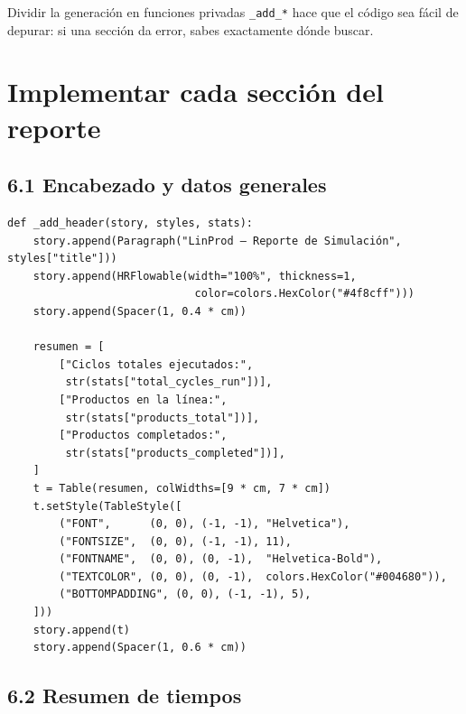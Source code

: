 \documentclass[12pt,letterpaper]{article}
\begin{document}
\begin{tcolorbox}[notebox={¿Por qué este diseño?}]
  Dividir la generación en funciones privadas \texttt{\_add\_*} hace que el
  código sea fácil de depurar: si una sección da error, sabes exactamente
  dónde buscar.
\end{tcolorbox}

\section{Implementar cada sección del reporte}

\subsection{6.1 Encabezado y datos generales}

\begin{lstlisting}
def _add_header(story, styles, stats):
    story.append(Paragraph("LinProd — Reporte de Simulación", styles["title"]))
    story.append(HRFlowable(width="100%", thickness=1,
                             color=colors.HexColor("#4f8cff")))
    story.append(Spacer(1, 0.4 * cm))

    resumen = [
        ["Ciclos totales ejecutados:",
         str(stats["total_cycles_run"])],
        ["Productos en la línea:",
         str(stats["products_total"])],
        ["Productos completados:",
         str(stats["products_completed"])],
    ]
    t = Table(resumen, colWidths=[9 * cm, 7 * cm])
    t.setStyle(TableStyle([
        ("FONT",      (0, 0), (-1, -1), "Helvetica"),
        ("FONTSIZE",  (0, 0), (-1, -1), 11),
        ("FONTNAME",  (0, 0), (0, -1),  "Helvetica-Bold"),
        ("TEXTCOLOR", (0, 0), (0, -1),  colors.HexColor("#004680")),
        ("BOTTOMPADDING", (0, 0), (-1, -1), 5),
    ]))
    story.append(t)
    story.append(Spacer(1, 0.6 * cm))
\end{lstlisting}

\subsection{6.2 Resumen de tiempos}
\end{document}
